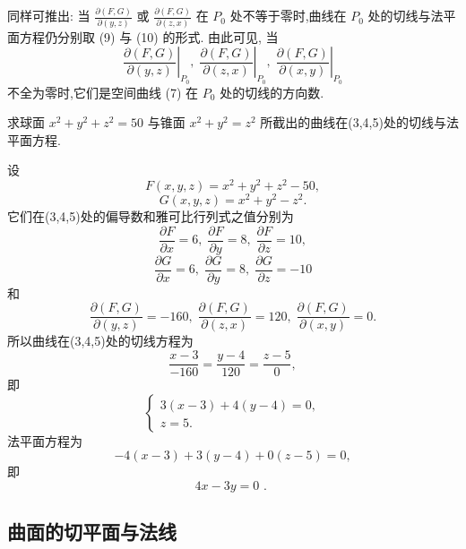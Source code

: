 同样可推出: 当 \(\frac{\partial \left( {F,G}\right) }{\partial \left( {y,z}\right) }\) 或 \(\frac{\partial \left( {F,G}\right) }{\partial \left( {z,x}\right) }\) 在 \({P}_{0}\) 处不等于零时,曲线在 \({P}_{0}\) 处的切线与法平面方程仍分别取 (9) 与 (10) 的形式. 由此可见, 当
\[
{\left. \frac{\partial \left( {F,G}\right) }{\partial \left( {y,z}\right) }\right| }_{{P}_{0}},{\left. \;\frac{\partial \left( {F,G}\right) }{\partial \left( {z,x}\right) }\right| }_{{P}_{0}},{\left. \;\frac{\partial \left( {F,G}\right) }{\partial \left( {x,y}\right) }\right| }_{{P}_{0}}
\]
不全为零时,它们是空间曲线 (7) 在 \({P}_{0}\) 处的切线的方向数.

\begin{example}

\end{example}
求球面 \({x}^{2} + {y}^{2} + {z}^{2} = {50}\) 与锥面 \({x}^{2} + {y}^{2} = {z}^{2}\) 所截出的曲线在(3,4,5)处的切线与法平面方程.

\begin{solution}

\end{solution}
设
\[
F\left( {x,y,z}\right)  = {x}^{2} + {y}^{2} + {z}^{2} - {50},
\]
\[
G\left( {x,y,z}\right)  = {x}^{2} + {y}^{2} - {z}^{2}.
\]
它们在(3,4,5)处的偏导数和雅可比行列式之值分别为
\[
\frac{\partial F}{\partial x} = 6,\;\frac{\partial F}{\partial y} = 8,\;\frac{\partial F}{\partial z} = {10},
\]
\[
\frac{\partial G}{\partial x} = 6,\;\frac{\partial G}{\partial y} = 8,\;\frac{\partial G}{\partial z} =  - {10}
\]
和
\[
\frac{\partial \left( {F,G}\right) }{\partial \left( {y,z}\right) } =  - {160},\;\frac{\partial \left( {F,G}\right) }{\partial \left( {z,x}\right) } = {120},\;\frac{\partial \left( {F,G}\right) }{\partial \left( {x,y}\right) } = 0.
\]
所以曲线在(3,4,5)处的切线方程为
\[
\frac{x - 3}{-{160}} = \frac{y - 4}{120} = \frac{z - 5}{0},
\]
即
\[
\left\{  \begin{array}{l} 3\left( {x - 3}\right)  + 4\left( {y - 4}\right)  = 0, \\  z = 5. \end{array}\right.
\]
法平面方程为
\[
- 4\left( {x - 3}\right)  + 3\left( {y - 4}\right)  + 0\left( {z - 5}\right)  = 0,
\]
即
\[
{4x} - {3y} = 0\text{ . }
\]
\subsection{曲面的切平面与法线}

